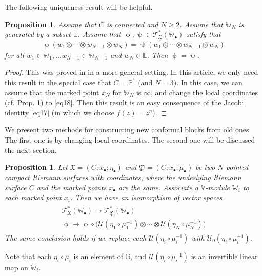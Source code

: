 \documentclass[11pt,b5paper,notitlepage]{article}
\theoremstyle{definition}
\theoremstyle{plain}
\newtheorem{pp}[df]{Proposition}
\newcommand{\fk}{\mathfrak}
\newcommand{\mc}{\mathcal}
\newcommand{\scr}{\mathscr}
\newcommand{\blt}{\bullet}
\newcommand{\Vbb}{\mathbb V}
\newcommand{\Wbb}{\mathbb W}
\newcommand{\Gbb}{\mathbb G}
\newcommand{\Pbb}{\mathbb P}
\newcommand{\Ebb}{\mathbb E}
\numberwithin{equation}{section}
\begin{document}
The following uniqueness result will be helpful.
\begin{pp}\label{lb20}
Assume that $C$ is connected and $N\geq 2$. Assume that $\Wbb_N$ is generated by a subset $\Ebb$. Assume that $\upphi,\uppsi\in\scr T_{\fk X}^*(\Wbb_\blt)$ satisfy that
\begin{align*}
\upphi(w_1\otimes\cdots\otimes w_{N-1}\otimes w_N)=\uppsi(w_1\otimes\cdots\otimes w_{N-1}\otimes w_N)
\end{align*}
for all $w_1\in\Wbb_1,\dots w_{N-1}\in\Wbb_{N-1}$ and $w_N\in\Ebb$. Then $\upphi=\uppsi$.
\end{pp}

\begin{proof}
This was proved in \cite[Prop. 7.2]{Gui21} in a more general setting. In this article, we only need this result in the special case that $C=\Pbb^1$ (and $N=3$). In this case, we can assume that the marked point $x_N$ for $\Wbb_N$ is $\infty$, and  change the local coordinates  (cf. Prop. \ref{lb6}) to \eqref{eq18}. Then this result is an easy consequence of the Jacobi identity \eqref{eq17} (in which we choose $f(z)=z^n$).
\end{proof}






We present two methods for constructing new conformal blocks from old ones. The first one is by changing local coordinates. The second one will be discussed the next section.

\begin{pp}\label{lb6}
Let $\fk X=(C;x_\blt;\eta_\blt)$ and $\fk Y=(C;x_\blt;\mu_\blt)$ be two $N$-pointed compact Riemann surfaces with coordinates, where the underlying Riemann surface $C$ and the marked points $x_\blt$ are the same. Associate a $\Vbb$-module $\Wbb_i$ to each marked point $x_i$. Then we have an isomorphism of vector spaces
\begin{gather}\label{eq62}
\begin{gathered}
\scr T_{\fk X}^*(\Wbb_\blt)\rightarrow\scr T_{\fk Y}^*(\Wbb_\blt)\\
\upphi\mapsto \upphi\circ\big(\mc U(\eta_1\circ\mu_1^{-1})\otimes\cdots \otimes\mc U(\eta_N\circ\mu_N^{-1})\big)
\end{gathered}
\end{gather}
The same conclusion holds if we replace each $\mc U(\eta_i\circ\mu_i^{-1})$ with $\mc U_0(\eta_i\circ\mu_i^{-1})$.
\end{pp}

Note that each $\eta_i\circ\mu_i$ is an element of $\Gbb$, and $\mc U(\eta_i\circ\mu_i^{-1})$ is an invertible linear map on $\Wbb_i$.
\end{document}
